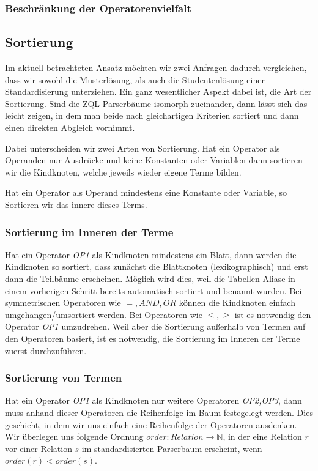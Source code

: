 \subsubsection{Beschränkung der Operatorenvielfalt}

\subsection{Sortierung}

Im aktuell betrachteten Ansatz möchten wir zwei Anfragen dadurch vergleichen, dass wir sowohl die Musterlösung, als auch die Studentenlösung einer Standardisierung unterziehen. Ein ganz wesentlicher Aspekt dabei ist, die Art der Sortierung. Sind die ZQL-Parserbäume isomorph zueinander, dann lässt sich das leicht zeigen, in dem man beide nach gleichartigen Kriterien sortiert und dann einen direkten Abgleich vornimmt.

Dabei unterscheiden wir zwei Arten von Sortierung. Hat ein Operator als Operanden nur Ausdrücke und keine Konstanten oder Variablen dann sortieren wir die Kindknoten, welche jeweils wieder eigene Terme bilden.

Hat ein Operator als Operand mindestens eine Konstante oder Variable, so Sortieren wir das innere dieses Terms.

\subsubsection{Sortierung im Inneren der Terme}

Hat ein Operator \textit{OP1} als Kindknoten mindestens ein Blatt, dann werden die Kindknoten so sortiert, dass zunächst die Blattknoten (lexikographisch) und erst dann die Teilbäume erscheinen. Möglich wird dies, weil die Tabellen-Aliase in einem vorherigen Schritt bereits automatisch sortiert und benannt wurden. Bei symmetrischen Operatoren wie $=,  \textit{AND}, \textit{OR}$ können die Kindknoten einfach umgehangen/umsortiert werden. Bei Operatoren wie $\le,\ge$ ist es notwendig den Operator \textit{OP1} umzudrehen. Weil aber die Sortierung außerhalb von Termen auf den Operatoren basiert, ist es notwendig, die Sortierung im Inneren der Terme zuerst durchzuführen.

\subsubsection{Sortierung von Termen}

Hat ein Operator \textit{OP1} als Kindknoten nur weitere Operatoren \textit{OP2,OP3}, dann muss anhand dieser Operatoren die Reihenfolge im Baum festegelegt werden. Dies geschieht, in dem wir uns einfach eine Reihenfolge der Operatoren ausdenken. Wir überlegen uns folgende Ordnung $order:\textit{Relation}\to\mathbb{N}$, in der eine Relation $r$ vor einer Relation $s$ im standardisierten Parserbaum erscheint, wenn $order(r) < order(s)$.

